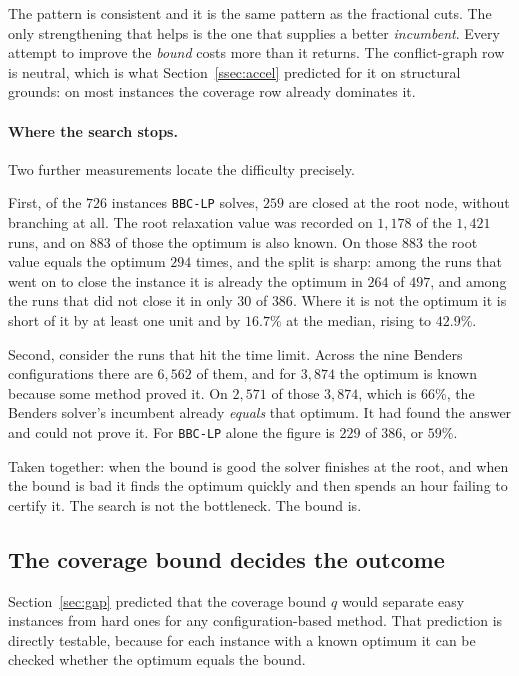 The pattern is consistent and it is the same pattern as the fractional cuts. The only
strengthening that helps is the one that supplies a better \emph{incumbent}. Every
attempt to improve the \emph{bound} costs more than it returns. The conflict-graph row
is neutral, which is what Section~\ref{ssec:accel} predicted for it on structural
grounds: on most instances the coverage row already dominates it.

\paragraph{Where the search stops.}
Two further measurements locate the difficulty precisely.

First, of the $726$ instances \texttt{BBC-LP} solves, $259$ are closed at the root
node, without branching at all. The root relaxation value was recorded on $1{,}178$ of
the $1{,}421$ runs, and on $883$ of those the optimum is also known. On those $883$ the
root value equals the optimum $294$ times, and the split is sharp: among the runs that
went on to close the instance it is already the optimum in $264$ of $497$, and among
the runs that did not close it in only $30$ of $386$. Where it is not the optimum it is
short of it by at least one unit and by $16.7\%$ at the median, rising to $42.9\%$.

Second, consider the runs that hit the time limit. Across the nine Benders
configurations there are $6{,}562$ of them, and for $3{,}874$ the optimum is known
because some method proved it. On $2{,}571$ of those $3{,}874$, which is $66\%$, the
Benders solver's incumbent already \emph{equals} that optimum. It had found the answer
and could not prove it. For \texttt{BBC-LP} alone the figure is $229$ of $386$, or
$59\%$.

Taken together: when the bound is good the solver finishes at the root, and when the
bound is bad it finds the optimum quickly and then spends an hour failing to certify
it. The search is not the bottleneck. The bound is.

\subsection{The coverage bound decides the outcome}\label{ssec:results-tight}

Section~\ref{sec:gap} predicted that the coverage bound $q$ would separate easy
instances from hard ones for any configuration-based method. That prediction is
directly testable, because for each instance with a known optimum it can be checked
whether the optimum equals the bound.

